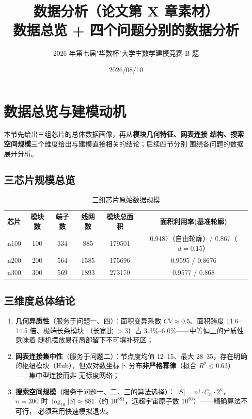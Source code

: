 \documentclass[12pt,a4paper]{article}
\title{\textbf{数据分析（论文第 X 章素材）}\\[6pt]
\large 数据总览 + 四个问题分别的数据分析}
\author{2026 年第七届"华数杯"大学生数学建模竞赛 B 题}
\date{2026/08/10}
\begin{document}
\maketitle

\section{数据总览与建模动机}

本节先给出三组芯片的总体数据画像，再从\textbf{模块几何特征、网表连接
结构、搜索空间规模}三个维度给出与建模直接相关的结论；后续四节分别
围绕各问题的数据展开分析。

\subsection{三芯片规模总览}

\begin{table}[H]
\centering
\scriptsize
\setlength{\tabcolsep}{3pt}
\caption{三组芯片原始数据规模}
\begin{tabular}{lccccc}
\toprule
芯片 & 模块数 & 端子数 & 线网数 & 模块总面积 & 面积利用率(基准轮廓) \\
\midrule
n100 & 100 & 334 & 885 & 179501 & 0.9487（自由轮廓）/ 0.867（$d{=}0.15$） \\
n200 & 200 & 564 & 1585 & 175696 & 0.9595 / 0.8676 \\
n300 & 300 & 569 & 1893 & 273170 & 0.9577 / 0.868 \\
\bottomrule
\end{tabular}
\end{table}

\subsection{三维度总体结论}

\begin{enumerate}[leftmargin=2em]
    \item \textbf{几何异质性}（服务于问题一、四）：面积变异系数
    $CV \approx 0.5$、面积跨度 11.6--14.5 倍、极端长条模块
    （长宽比 $>3$）占 3.3\%--6.0\%——中等偏上的异质性意味着
    随机摆放易在局部留下不可填补死区；
    \item \textbf{网表连接集中性}（服务于问题二）：节点度均值
    12--15、最大 28--35，存在明确的枢纽模块（Hub），但双对数坐标下
    分布\textbf{非严格幂律}（拟合 $R^2 \le 0.63$）——集中型连接而非
    无标度网络；
    \item \textbf{搜索空间规模}（服务于问题一、二、三的算法选择）：
    $|S| = n!\cdot C_n \cdot 2^n$，$n=300$ 时 $\log_{10}|S| \approx
    881$（约 $10^{881}$，远超宇宙原子数 $10^{80}$）——精确算法不可行，
    必须采用快速模拟退火。
\end{enumerate}
\end{document}
